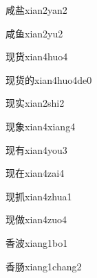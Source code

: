 \begin{verbete}[9;10]{咸盐}{xian2yan2}
\end{verbete}

\begin{verbete}[9;8]{咸鱼}{xian2yu2}
\end{verbete}

\begin{verbete}[8;8]{现货}{xian4huo4}
\end{verbete}

\begin{verbete}[8;8;8]{现货的}{xian4huo4de0}
\end{verbete}

\begin{verbete}[9;8]{现实}{xian2shi2}
\end{verbete}

\begin{verbete}[8;11]{现象}{xian4xiang4}
\end{verbete}

\begin{verbete}[8;6]{现有}{xian4you3}
\end{verbete}

\begin{verbete}[8;6]{现在}{xian4zai4}
\end{verbete}

\begin{verbete}[8;7]{现抓}{xian4zhua1}
\end{verbete}

\begin{verbete}[8;11]{现做}{xian4zuo4}
\end{verbete}

\begin{verbete}[9;8]{香波}{xiang1bo1}
\end{verbete}

\begin{verbete}[9;7]{香肠}{xiang1chang2}
\end{verbete}

